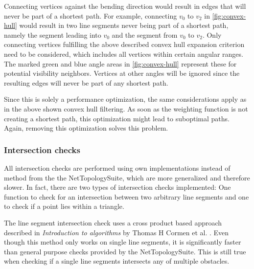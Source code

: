 			Connecting vertices against the bending direction would result in edges that will never be part of a shortest path.
			For example, connecting $v_0$ to $v_2$ in \cref{fig:convex-hull} would result in two line segments never being part of a shortest path, namely the segment leading into $v_0$ and the segment from $v_0$ to $v_2$. 
			Only connecting vertices fulfilling the above described convex hull expansion criterion need to be considered, which includes all vertices within certain angular ranges.
			The marked green and blue angle areas in \cref{fig:convex-hull} represent these  for potential visibility neighbors.
			Vertices at other angles will be ignored since the resulting edges will never be part of any shortest path.
			
			Since this is solely a performance optimization, the same considerations apply as in the above shown convex hull filtering.
			As soon as the weighting function is not creating a shortest path, this optimization might lead to suboptimal paths.
			Again, removing this optimization solves this problem.
			
		\subsubsection{Intersection checks}
		\label{subsubsec:intersection-checks}
			
			All intersection checks are performed using own implementations instead of method from the the NetTopologySuite, which are more generalized and therefore slower.
			In fact, there are two types of intersection checks implemented:
			One function to check for an intersection between two arbitrary line segments and one to check if a point lies within a triangle.
			
			The line segment intersection check uses a cross product based approach described in \emph{Introduction to algorithms} by Thomas H Cormen et al. \cite[1018]{cormen-introduction-to-alg}.
			Even though this method only works on single line segments, it is significantly faster than general purpose checks provided by the NetTopologySuite.
			This is still true when checking if a single line segments intersects any of multiple obstacles.
			
